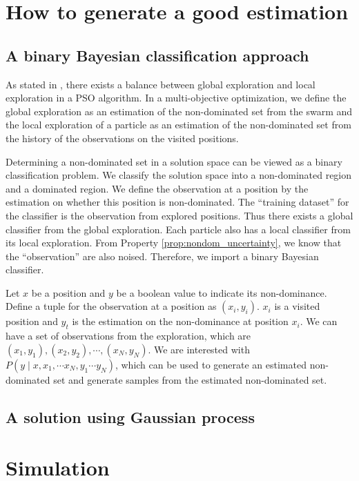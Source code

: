 \documentclass[12pt]{article}
\begin{document}
\section{How to generate a good estimation}

\subsection{A binary Bayesian classification approach}

As stated in \cite{bratton2007defining}, there exists a balance between global exploration and local exploration in a PSO algorithm.
In a multi-objective optimization, we define the global exploration as an estimation of the non-dominated set from the swarm and the local exploration of a particle as an estimation of the non-dominated set from the history of the observations on the visited positions. 

Determining a non-dominated set in a solution space can be viewed as a binary classification problem. 
We classify the solution space into a non-dominated region and a dominated region.
We define the observation at a position by the estimation on whether this position is non-dominated.
The ``training dataset'' for the classifier is the observation from explored positions.
Thus there exists a global classifier from the global exploration. Each particle also has a local classifier from its local exploration.
From Property \ref{prop:nondom_uncertainty}, we know that the ``observation'' are also noised.
Therefore, we import a binary Bayesian classifier.

Let $ x $ be a position and $ y $ be a boolean value to indicate its non-dominance.
Define a tuple for the observation at a position as $ (x_{i}, y_{i}) $.
$ x_{i} $ is a visited position and $ y_{t} $ is the estimation on the non-dominance at position $ x_{i} $.
We can have a set of observations from the exploration, which are $ { (x_{1}, y_{1}), (x_{2}, y_{2}) , \cdots , (x_{N}, y_{N}) } $. 
We are interested with $ P(y \mid x, x_{1}, \cdots x_{N}, y_{1} \cdots y_{N} ) $, which can be used to generate an estimated non-dominated set and generate samples from the estimated non-dominated set.

\subsection{A solution using Gaussian process}




\section{Simulation}
\end{document}
